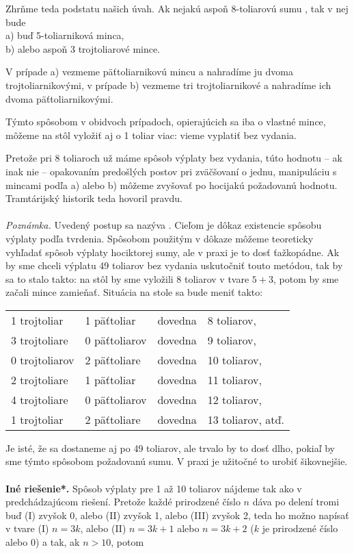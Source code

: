 {{Zhrňme teda podstatu našich úvah. Ak nejakú aspoň 8-toliarovú sumu , tak v nej bude\\
a) buď 5-toliarniková minca,\\
b) alebo aspoň 3 trojtoliarové mince.

 V prípade a) vezmeme päťtoliarnikovú mincu a nahradíme ju dvoma trojtoliarnikovými, v prípade b) vezmeme tri trojtoliarnikové a nahradíme ich dvoma päťtoliarnikovými.

Týmto spôsobom v obidvoch prípadoch, opierajúcich sa iba o vlastné mince, môžeme na stôl vyložiť aj o 1 toliar viac: vieme vyplatiť bez vydania.

Pretože pri 8 toliaroch už máme spôsob výplaty bez vydania, túto hodnotu -- ak inak nie -- opakovaním predošlých postov pri zväčšovaní o jednu, manipuláciu s mincami podľa a) alebo b) môžeme zvyšovať po hocijakú požadovanú hodnotu. Tramtárijský historik teda hovoril pravdu.\\
\\
\textit{Poznámka.} Uvedený postup sa nazýva . Cieľom je dôkaz existencie spôsobu výplaty podľa tvrdenia. Spôsobom použitým v dôkaze môžeme teoreticky vyhľadať spôsob výplaty hociktorej sumy, ale v praxi je to dosť ťažkopádne. Ak by sme chceli výplatu 49 toliarov bez vydania uskutočniť touto metódou, tak by sa to stalo takto: na stôl by sme vyložili 8 toliarov v tvare $5+3$, potom by sme začali mince zamieňať. Situácia na stole sa bude meniť takto:\\
\begin{tabular}{l l l l}
1 trojtoliar & 1 päťtoliar & dovedna & 8 toliarov, \\
3 trojtoliare & 0 päťtoliarov & dovedna & 9 toliarov, \\
0 trojtoliarov & 2 päťtoliare & dovedna & 10 toliarov, \\
2 trojtoliare & 1 päťtoliar & dovedna & 11 toliarov, \\
4 trojtoliare & 0 päťtoliarov & dovedna & 12 toliarov, \\
1 trojtoliar & 2 päťtoliare & dovedna & 13 toliarov, atď.\\
\end{tabular}

Je isté, že sa dostaneme aj po 49 toliarov, ale trvalo by to dosť dlho, pokiaľ by sme týmto spôsobom  požadovanú sumu. V praxi je užitočné to urobiť šikovnejšie.\\
\\
\textbf{Iné riešenie*.} Spôsob výplaty pre 1 až 10 toliarov nájdeme tak ako v predchádzajúcom riešení. Pretože každé prirodzené číslo $n$ dáva po delení tromi buď (I) zvyšok 0, alebo (II) zvyšok 1, alebo (III) zvyšok 2, teda ho možno napísať v tvare (I) $n=3k$, alebo (II) $n=3k+1$ alebo $n=3k+2$ ($k$ je prirodzené číslo alebo 0) a tak, ak $n>10$, potom

}}
